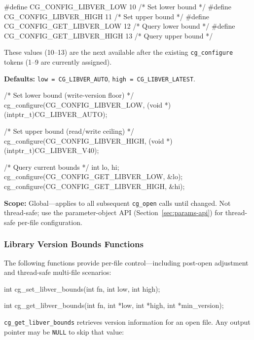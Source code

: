 \documentclass[11pt,letterpaper]{article}
\makeatletter
\let\cgns@orig@lstlisting\lstlisting
\let\cgns@endorig@lstlisting\endlstlisting
\renewenvironment{lstlisting}
  {\par\needspace{5\baselineskip}\nolinenumbers\cgns@orig@lstlisting}
  {\cgns@endorig@lstlisting\par\linenumbers}
\makeatother
\begin{document}
\begin{lstlisting}[language=C]
#define CG_CONFIG_LIBVER_LOW       10  /* Set lower bound */
#define CG_CONFIG_LIBVER_HIGH      11  /* Set upper bound */
#define CG_CONFIG_GET_LIBVER_LOW   12  /* Query lower bound */
#define CG_CONFIG_GET_LIBVER_HIGH  13  /* Query upper bound */
\end{lstlisting}

\noindent These values (10--13) are the next available after the
existing \texttt{cg\_configure} tokens (1--9 are currently assigned).

\textbf{Defaults:} \texttt{low~=~CG\_LIBVER\_AUTO},
\texttt{high~=~CG\_LIBVER\_LATEST}.

\begin{lstlisting}[language=C]
/* Set lower bound (write-version floor) */
cg_configure(CG_CONFIG_LIBVER_LOW,
             (void *)(intptr_t)CG_LIBVER_AUTO);

/* Set upper bound (read/write ceiling) */
cg_configure(CG_CONFIG_LIBVER_HIGH,
             (void *)(intptr_t)CG_LIBVER_V40);

/* Query current bounds */
int lo, hi;
cg_configure(CG_CONFIG_GET_LIBVER_LOW,  &lo);
cg_configure(CG_CONFIG_GET_LIBVER_HIGH, &hi);
\end{lstlisting}

\textbf{Scope:}  Global---applies to all subsequent \texttt{cg\_open}
calls until changed.  Not thread-safe; use the parameter-object API
(Section~\ref{sec:params-api}) for thread-safe per-file configuration.

\subsubsection{Library Version Bounds Functions}

The following functions provide per-file control---including post-open
adjustment and thread-safe multi-file scenarios:

\begin{lstlisting}[language=C]
int cg_set_libver_bounds(int fn,
                               int low, int high);

int cg_get_libver_bounds(int fn,
                               int *low, int *high,
                               int *min_version);
\end{lstlisting}

\texttt{cg\_get\_libver\_bounds} retrieves version information
for an open file.  Any output pointer may be \texttt{NULL} to skip
that value:
\end{document}
